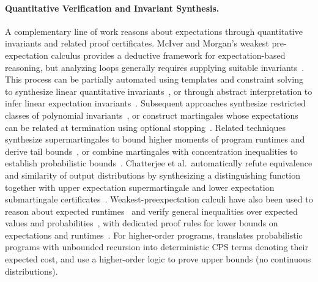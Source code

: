 \paragraph{Quantitative Verification and Invariant Synthesis.}
A complementary line of work reasons about expectations through quantitative invariants and related proof certificates. McIver and Morgan's weakest pre-expectation calculus provides a deductive framework for expectation-based reasoning, but analyzing loops generally requires supplying suitable invariants~\cite{mciver2005abstraction}. This process can be partially automated using templates and constraint solving to synthesize linear quantitative invariants~\cite{katoen2010linear}, or through abstract interpretation to infer linear expectation invariants~\cite{chakarov2014expectation}. Subsequent approaches synthesize restricted classes of polynomial invariants~\cite{chen2015counterexample,feng2017finding}, or construct martingales whose expectations can be related at termination using optional stopping~\cite{barthe2016synthesizing}. Related techniques synthesize supermartingales to bound higher moments of program runtimes and derive tail bounds~\cite{kura2019}, or combine martingales with concentration inequalities to establish probabilistic bounds~\cite{chakarov2013martingales}. Chatterjee et al.\ automatically refute equivalence and similarity of output distributions by synthesizing a distinguishing function together with upper expectation supermartingale and lower expectation submartingale certificates~\cite{chatterjee2024equivalence}. Weakest-preexpectation calculi have also been used to reason about expected runtimes~\cite{kaminski2016weakest} and verify general inequalities over expected values and probabilities~\cite{batz2021relatively}, with dedicated proof rules for lower bounds on expectations and runtimes~\cite{hark2020aiming}. For higher-order programs, \cite{avanzini2021continuation} translates probabilistic programs with unbounded recursion into deterministic CPS terms denoting their expected cost, and use a higher-order logic to prove upper bounds (no continuous distributions). 


